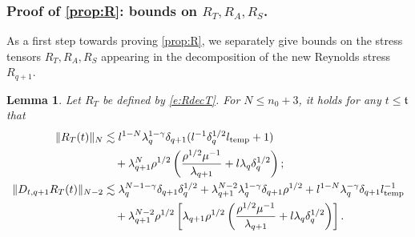 \documentclass[10pt,a4paper]{amsart}
\numberwithin{equation}{section}
\numberwithin{corollario}{section}
\newtheorem{lemma}{Lemma}
\numberwithin{lemma}{section}
\numberwithin{prop}{section}
\theoremstyle{definition}
\theoremstyle{remark}
\newcommand{\qq}{_{q+1}}
\begin{document}
\subsubsection{Proof of \autoref{prop:R}: bounds on $R_T,R_A,R_S$.}
As a first step towards proving \autoref{prop:R}, we separately give bounds on the stress tensors $R_T,R_A,R_S$ appearing in the decomposition of the new Reynolds stress $R\qq$.
\begin{lemma}\label{lemma:RT}
Let $R_T$ be defined by \eqref{e:RdecT}.
    For $N\le n_0+3$, it holds for any $t\le \mathfrak{t}$ that
    \begin{align}
        \|R_T(t)\|_N
        &\lesssim 
        l^{1-N}\lambda_q^{1-\gamma}\delta\qq(l^{-1}\delta_q^{1/2}l_{\rm temp}+1)
        \\
        &\quad+\lambda\qq^N\rho^{1/2}\left(\frac{\rho^{1/2}\mu^{-1}}{\lambda\qq}+l\lambda_q\delta_q^{1/2}\right) ;
        \\
        \|D_{t,q+1}R_T(t)\|_{N-2}
        &\lesssim
        \lambda_q^{N-1-\gamma}\delta\qq\delta_q^{1/2}+ \lambda\qq^{N-2}\lambda_q^{1-\gamma}\delta\qq \rho^{1/2}+l^{1-N}\lambda_q^{-\gamma}\delta\qq l_{\rm temp}^{-1}\\
        &\quad+\lambda\qq^{N-2}\rho^{1/2}\left[\lambda\qq\rho^{1/2}\left(\frac{\rho^{1/2}\mu^{-1}}{\lambda\qq}+l\lambda_q\delta_q^{1/2}\right)\right]
        .
    \end{align}
\end{lemma}
\end{document}
